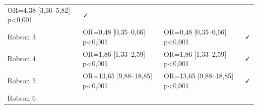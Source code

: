 \documentclass[
]{article}
\begin{document}
\begin{longtable}[]{@{}llll@{}}
\begin{minipage}[t]{0.22\columnwidth}
OR=4,38 {[}3,30--5,82{]} p\textless0,001\strut
\end{minipage} & \begin{minipage}[t]{0.22\columnwidth}\raggedright
✓\strut
\end{minipage}\tabularnewline
\begin{minipage}[t]{0.22\columnwidth}\raggedright
Robson 3\strut
\end{minipage} & \begin{minipage}[t]{0.22\columnwidth}\raggedright
OR=0,48 {[}0,35--0,66{]} p\textless0,001\strut
\end{minipage} & \begin{minipage}[t]{0.22\columnwidth}\raggedright
OR=0,48 {[}0,35--0,66{]} p\textless0,001\strut
\end{minipage} & \begin{minipage}[t]{0.22\columnwidth}\raggedright
✓\strut
\end{minipage}\tabularnewline
\begin{minipage}[t]{0.22\columnwidth}\raggedright
Robson 4\strut
\end{minipage} & \begin{minipage}[t]{0.22\columnwidth}\raggedright
OR=1,86 {[}1,33--2,59{]} p\textless0,001\strut
\end{minipage} & \begin{minipage}[t]{0.22\columnwidth}\raggedright
OR=1,86 {[}1,33--2,59{]} p\textless0,001\strut
\end{minipage} & \begin{minipage}[t]{0.22\columnwidth}\raggedright
✓\strut
\end{minipage}\tabularnewline
\begin{minipage}[t]{0.22\columnwidth}\raggedright
Robson 5\strut
\end{minipage} & \begin{minipage}[t]{0.22\columnwidth}\raggedright
OR=13,65 {[}9,88--18,85{]} p\textless0,001\strut
\end{minipage} & \begin{minipage}[t]{0.22\columnwidth}\raggedright
OR=13,65 {[}9,88--18,85{]} p\textless0,001\strut
\end{minipage} & \begin{minipage}[t]{0.22\columnwidth}\raggedright
✓\strut
\end{minipage}\tabularnewline
\begin{minipage}[t]{0.22\columnwidth}\raggedright
Robson 6\strut
\end{minipage} & \begin{minipage}[t]{0.22\columnwidth}\raggedright

\end{minipage}
\end{longtable}
\end{document}
